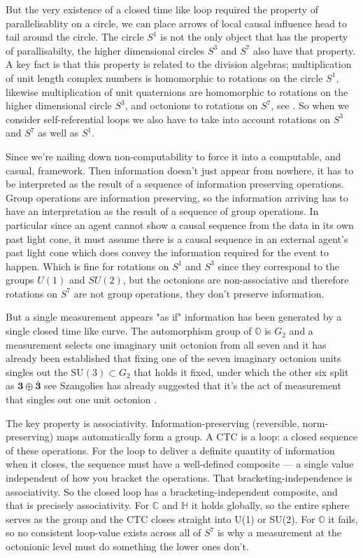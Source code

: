 But the very existence of a closed time like loop required the property of parallelisablity on a
circle, we can place arrows of local causal influence head to tail around the circle. The circle
$S^1$ is not the only object that has the property of parallisabilty, the higher dimensional
circles $S^3$ and $S^7$ also have that property. A key fact is that this property is related to
the division algebras; multiplication of unit length complex numbers is homomorphic to rotations
on the circle $S^1$, likewise multiplication of unit quaternions are homomorphic to rotations on
the higher dimensional circle $S^3$, and octonions to rotations on $S^7$, see
\autocite{baez2002octonions}. So when we consider self-referential loops we also have to take
into account rotations on $S^3$ and $S^7$ as well as $S^1$.

Since we're nailing down non-computability to force it into a computable, and casual, framework.
Then information doesn't just appear from nowhere, it has to be interpreted as the result of a
sequence of information preserving operations. Group operations are information preserving, so
the information arriving has to have an interpretation as the result of a sequence of group
operations. In particular since an agent cannot show a causal sequence from the data in its own
past light cone, it must assume there is a causal sequence in an external agent's past light
cone which does convey the information required for the event to happen. Which is fine for
rotations on $S^1$ and $S^3$ since they correspond to the groups $U(1)$ and $SU(2)$, but the
octonions are non-associative and therefore rotations on $S^7$ are not group operations, they
don't preserve information.

But a single measurement appears "as if" information has been generated by a single closed time
like curve. The automorphism group of $\mathbb{O}$ is $G_2$ and a measurement selects one
imaginary unit octonion from all seven and it has already been established that fixing one of
the seven imaginary octonion units singles out the $\mathrm{SU}(3) \subset G_2$ that holds it
fixed, under which the other six split as $\mathbf{3} \oplus \bar{\mathbf{3}}$ see
\autocite{gunaydingursey1974quark, conway_2003} Szangolies has already suggested that it's the
act of measurement that singles out one unit octonion \autocite{szangolies2025standardmodel}.

The key property is associativity. Information-preserving (reversible, norm-preserving) maps
automatically form a group. A CTC is a loop: a closed sequence of these operations. For the loop
to deliver a definite quantity of information when it closes, the sequence must have a
well-defined composite --- a single value independent of how you bracket the operations. That
bracketing-independence is associativity. So the closed loop has a bracketing-independent
composite, and that is precisely associativity. For $\mathbb{C}$ and $\mathbb{H}$ it holds
globally, so the entire sphere serves as the group and the CTC closes straight into U(1) or
SU(2). For $\mathbb{O}$ it fails, so no consistent loop-value exists across all of $S^7$ is why
a measurement at the octonionic level must do something the lower ones don't.

